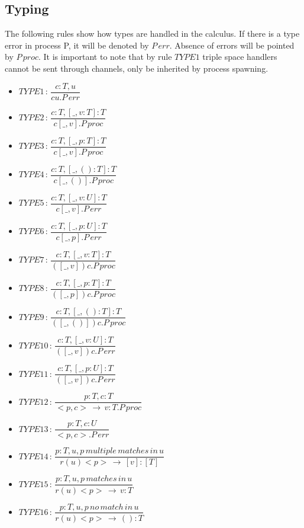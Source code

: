 \subsection{Typing}
The following rules show how types are handled in the calculus. If there is a type error in process P, it will be denoted by $P\,err$. Absence of errors will be pointed by $P\,proc$. It is important to note that by rule $TYPE1$ triple space handlers cannot be sent through channels, only be inherited by process spawning.
\begin{itemize}
  \item $TYPE1\,:\,\dfrac{c:T,u}{cu.P\,err}$
  \item $TYPE2\,:\,\dfrac{c:T,[\_,v:T]:T}{c[\_,v].P\,proc}$
  \item $TYPE3\,:\,\dfrac{c:T,[\_,p:T]:T}{c[\_,v].P\,proc}$
  \item $TYPE4\,:\,\dfrac{c:T,[\_,():T]:T}{c[\_,()].P\,proc}$
  \item $TYPE5\,:\,\dfrac{c:T,[\_,v:U]:T}{c[\_,v].P\,err}$
  \item $TYPE6\,:\,\dfrac{c:T,[\_,p:U]:T}{c[\_,p].P\,err}$
  \item $TYPE7\,:\,\dfrac{c:T,[\_,v:T]:T}{([\_,v])c.P\,proc}$
  \item $TYPE8\,:\,\dfrac{c:T,[\_,p:T]:T}{([\_,p])c.P\,proc}$
  \item $TYPE9\,:\,\dfrac{c:T,[\_,():T]:T}{([\_,()])c.P\,proc}$
  \item $TYPE10\,:\,\dfrac{c:T,[\_,v:U]:T}{([\_,v])c.P\,err}$
  \item $TYPE11\,:\,\dfrac{c:T,[\_,p:U]:T}{([\_,v])c.P\,err}$
  \item $TYPE12\,:\,\dfrac{p:T,c:T}{<p,c>\,\rightarrow\,v:T.P\,proc}$
  \item $TYPE13\,:\,\dfrac{p:T,c:U}{<p,c>.P\,err}$
  \item $TYPE14\,:\,\dfrac{p:T,u,p\,multiple\,matches\,in\,u}{r(u)<p>\,\rightarrow\,[v]:[T]}$
  \item $TYPE15\,:\,\dfrac{p:T,u,p\,matches\,in\,u}{r(u)<p>\,\rightarrow\,v:T}$
  \item $TYPE16\,:\,\dfrac{p:T,u,p\,no\,match\,in\,u}{r(u)<p>\,\rightarrow\,():T}$
\end{itemize}
